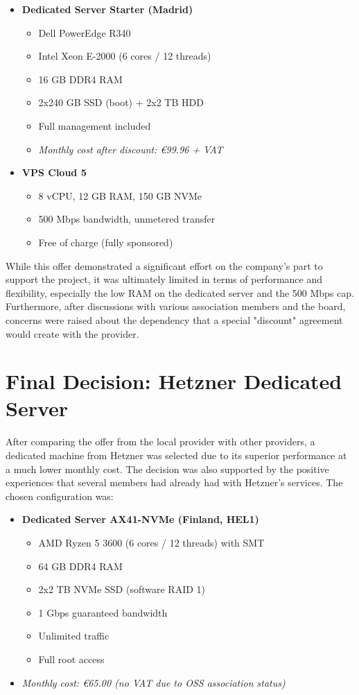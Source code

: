 \begin{itemize}
  \item \textbf{Dedicated Server Starter (Madrid)}
    \begin{itemize}
      \item Dell PowerEdge R340
      \item Intel Xeon E-2000 (6 cores / 12 threads)
      \item 16 GB DDR4 RAM
      \item 2x240 GB SSD (boot) + 2x2 TB HDD
      \item Full management included
      \item \textit{Monthly cost after discount: €99.96 + VAT}
    \end{itemize}
  \item \textbf{VPS Cloud 5}
    \begin{itemize}
      \item 8 vCPU, 12 GB RAM, 150 GB NVMe
      \item 500 Mbps bandwidth, unmetered transfer
      \item Free of charge (fully sponsored)
    \end{itemize}
\end{itemize}

While this offer demonstrated a significant effort on the company's part to support the project, it was ultimately limited in terms of performance and flexibility, especially the low RAM on the dedicated server and the 500 Mbps cap. Furthermore, after discussions with various association members and the board, concerns were raised about the dependency that a special "discount" agreement would create with the provider.

\section{Final Decision: Hetzner Dedicated Server}

After comparing the offer from the local provider with other providers, a dedicated machine from Hetzner was selected due to its superior performance at a much lower monthly cost. The decision was also supported by the positive experiences that several members had already had with Hetzner's services. The chosen configuration was:

\begin{itemize}
  \item \textbf{Dedicated Server AX41-NVMe (Finland, HEL1)}
  \begin{itemize}
    \item AMD Ryzen 5 3600 (6 cores / 12 threads) with SMT
    \item 64 GB DDR4 RAM
    \item 2x2 TB NVMe SSD (software RAID 1)
    \item 1 Gbps guaranteed bandwidth
    \item Unlimited traffic
    \item Full root access
  \end{itemize}
  \item \textit{Monthly cost: €65.00 (no VAT due to OSS association status)}
\end{itemize}


